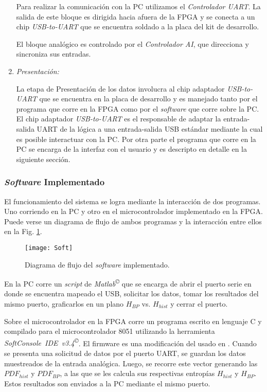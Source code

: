 \begin{enumerate}
	Para realizar la comunicación con la PC utilizamos el \textit{Controlador UART}.
	La salida de este bloque es dirigida hacia afuera de la FPGA y se conecta a un chip \textit{USB-to-UART} que se encuentra soldado a la placa del kit de desarrollo.
	
	El bloque analógico es controlado por el \textit{Controlador AI}, que direcciona y sincroniza sus entradas.
	
	\item \textit{Presentación:}
	
	La etapa de Presentación de los datos involucra al chip adaptador \textit{USB-to-UART} que se encuentra en la placa de desarrollo y es manejado tanto por el programa que corre en la FPGA como por el \textit{software} que corre sobre la PC.
	El chip adaptador \textit{USB-to-UART} es el responsable de adaptar la entrada-salida UART de la lógica a una entrada-salida USB estándar mediante la cual es posible interactuar con la PC.
	Por otra parte el programa que corre en la PC se encarga de la interfaz con el usuario y es descripto en detalle en la siguiente sección.
	
\end{enumerate}

\subsubsection{\textit{Software} Implementado}
\label{sec:Software}

El funcionamiento del sistema se logra mediante la interacción de dos programas.
Uno corriendo en la PC y otro en el microcontrolador implementado en la FPGA.
Puede verse un diagrama de flujo de ambos programas y la interacción entre ellos en la Fig. \ref{fig.softflow}.
%
\begin{figure}[htpb]
	\centering\texttt{[image: Soft]}
	\caption{Diagrama de flujo del \textit{software} implementado.}\label{fig.softflow}
\end{figure}

En la PC corre un \textit{script} de \textit{Matlab\textsuperscript\copyright} que se encarga de abrir el puerto serie en donde se encuentra mapeado el USB, solicitar los datos, tomar los resultados del mismo puerto, graficarlos en un plano $H_{BP}$ vs. $H_{hist}$ y cerrar el puerto.

Sobre el microcontrolador en la FPGA corre un programa escrito en lenguaje C y compilado para el microcontrolador 8051 utilizando la herramienta \textit{SoftConsole~IDE~v3.4\textsuperscript\copyright}.
El firmware es una modificación del usado en \cite{Core8051sS}. Cuando se presenta una solicitud de datos por el puerto UART, se guardan los datos muestreados de la entrada analógica.
Luego, se recorre este vector generando las $PDF_{hist}$ y $PDF_{BP}$, a las que se les calcula sus respectivas entropías $H_{hist}$ y $H_{BP}$.
Estos resultados son enviados a la PC mediante el mismo puerto.

